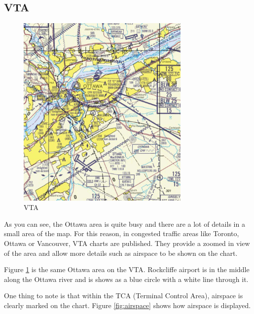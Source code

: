 \documentclass[12pt,letterpaper]{article}
\begin{document}
        \subsection{VTA}
        \begin{figure}[H]
            \centering
            \includegraphics[width=0.75\textwidth]{vta.jpeg}
            \caption{VTA}
            \label{fig:vta}
        \end{figure}
        
        As you can see, the Ottawa area is quite busy and there are a lot of details in a small area of the map. For this reason, in congested traffic areas like Toronto, Ottawa or Vancouver, VTA charts are published. They provide a zoomed in view of the area and allow more details such as airspace to be shown on the chart.
        
        Figure \ref{fig:vta} is the same Ottawa area on the VTA. Rockcliffe airport is in the middle along the Ottawa river and is shows as a blue circle with a white line through it.
        
        One thing to note is that within the TCA (Terminal Control Area), airspace is clearly marked on the chart. Figure \ref{fig:airspace} shows how airspace is displayed. 
        
\end{document}
